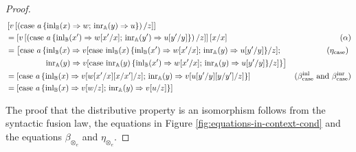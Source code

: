 \documentclass[10pt,a4paper]{amsart}
\theoremstyle{definition}
\theoremstyle{definition}
\theoremstyle{definition}
\theoremstyle{definition}
\theoremstyle{definition}
\theoremstyle{definition}
\begin{document}
\begin{proof}
\begin{align*}
  &\left[v\left[ \left(\text{case } a \,\{\mathrm{inl}_{\mathbb{B}}(x) \Rightarrow w ; \, \mathrm{inr}_{\mathbb{A}}(y) \Rightarrow u\}\right)  / z \right]\right] & \\
  & = \left[v\left[ \left(\text{case } a \,\{\mathrm{inl}_{\mathbb{B}}(x') \Rightarrow w[x'/x] ; \, \mathrm{inr}_{\mathbb{A}}(y') \Rightarrow u[y'/y]\}\right)  / z \right]\right] [x/x]  & (\alpha) \\
  & = \big[ \text{case } a \,\{\mathrm{inl}_{\mathbb{B}}(x) \Rightarrow v[\text{case } \mathrm{inl}_{\mathbb{B}}(x) \,\{\mathrm{inl}_{\mathbb{B}}(x') \Rightarrow w[x'/x] ; \, \mathrm{inr}_{\mathbb{A}}(y) \Rightarrow u[y'/y]\}/z] ; \, & (\eta_{\text{case}}) \ \\
   & \hspace{50pt} \mathrm{inr}_{\mathbb{A}}(y) \Rightarrow  v[\text{case } \mathrm{inr}_{\mathbb{A}}(y) \,\{\mathrm{inl}_{\mathbb{B}}(x') \Rightarrow w[x'/x] ; \, \mathrm{inr}_{\mathbb{A}}(y) \Rightarrow u[y'/y]\}/z]\}\big]  \\
   & = \left[\text{case } a \,\{\mathrm{inl}_{\mathbb{B}}(x) \Rightarrow v[w[x'/x][x/x']/z] ; \, \mathrm{inr}_{\mathbb{A}}(y) \Rightarrow v[u[y'/y][y/y']/z]\}\right]   & (\beta_{\text{case}}^{\text{inl}} \text{ and } \beta_{\text{case}}^{\text{inr}}  ) \\
   & = \left[ \text{case } a \,\{\mathrm{inl}_{\mathbb{B}}(x) \Rightarrow v[w/z] ; \, \mathrm{inr}_{\mathbb{A}}(y) \Rightarrow v[u/z]\}\right] 
\end{align*}

The proof that the distributive property is an isomorphism follows from the syntactic fusion law, the equations in Figure \ref{fig:equations-in-context-cond} and the equations $\beta_{\otimes_{e}}$ and $\eta_{\otimes_{e}}$. 


\end{proof}
\end{document}
